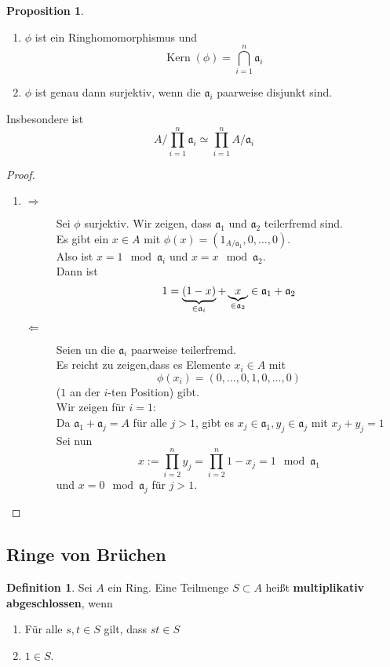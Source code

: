 \documentclass[10pt,a4paper]{article}
\newcommand{\Kern}{\operatorname{Kern}}
\theoremstyle{plain}
\theoremstyle{definition}
\newtheorem{definition}[theorem]{Definition}
\newtheorem{prop}[theorem]{Proposition}
\theoremstyle{remark}
\begin{document}
	\begin{prop}
		\begin{enumerate}
			\item $\phi$ ist ein Ringhomomorphismus und
			\[\Kern(\phi)=\bigcap_{i=1}^n\mathfrak a_i\]
			\item $\phi$ ist genau dann surjektiv, wenn die $\mathfrak a_i$ paarweise disjunkt sind.
		\end{enumerate}
		Insbesondere ist
		\[A/\prod_{i=1}^n\mathfrak a_i\simeq \prod_{i=1}^nA/\mathfrak a_i\]
	\end{prop}
	\begin{proof}
		\begin{enumerate}
			\item \begin{description}
				\item[$\Rightarrow$] Sei $\phi$ surjektiv. Wir zeigen, dass $\mathfrak a_1$ und $\mathfrak a_2$ teilerfremd sind.\\
				Es gibt ein $x\in A$ mit $\phi(x)=(1_{A/\mathfrak a_1},0,...,0)$.\\
				Also ist $x=1\mod \mathfrak a_i$ und $x=x\mod \mathfrak a_2$.\\
				Dann ist
				\[1=\underbrace{(1-x)}_{\in\mathfrak a_i}+\underbrace{x}_{\mathclap{\in\mathfrak a_2}}\in \mathfrak a_1+\mathfrak a_2\]
				\item[$\Leftarrow$] Seien un die $\mathfrak a_i$ paarweise teilerfremd.\\
				Es reicht zu zeigen,dass es Elemente $x_i\in A$ mit
				\[\phi(x_i)=(0,...,0,1,0,...,0)\]
				($1$ an der $i$-ten Position) gibt.\\
				Wir zeigen für $i=1$:\\
				Da $\mathfrak a_1+\mathfrak a_j=A$ für alle $j>1$, gibt es $x_j\in \mathfrak a_1, y_j\in\mathfrak a_j$ mit $x_j+y_j=1$\\
				Sei nun
				\[x:=\prod_{i=2}^ny_j=\prod_{i=2}^n1-x_j=1\mod\mathfrak a_1\]
				und $x=0\mod\mathfrak a_j$ für $j>1$.
			\end{description}
		\end{enumerate}
	\end{proof}
	
	\subsection{Ringe von Brüchen}
	\begin{definition}
		Sei $A$ ein Ring. Eine Teilmenge $S\subset A$ heißt \textbf{multiplikativ abgeschlossen}, wenn
		\begin{enumerate}
			\item Für alle $s,t\in S$ gilt, dass $st\in S$
			\item $1\in S$.
		\end{enumerate}
	\end{definition}
\end{document}
